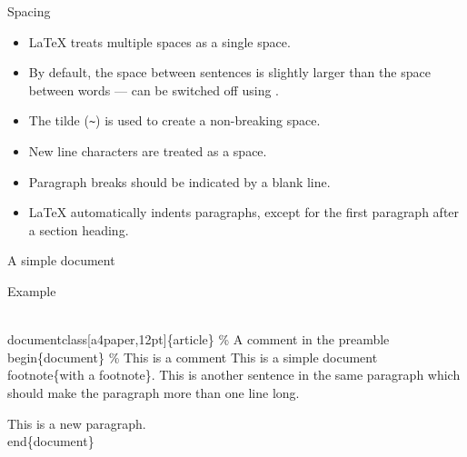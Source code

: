 \begin{frame}[fragile]{Spacing}

	\begin{itemize}
	  \item \LaTeX{} treats multiple spaces as a single space.
	  \item By default, the space between sentences is slightly larger than the space between words --- can be switched off using .
	  \item The tilde (\verb|~|) is used to create a non-breaking space.
	  \item New line characters are treated as a space.
	  \item Paragraph breaks should be indicated by a blank line.
	  \item \LaTeX{} automatically indents paragraphs, except for the first paragraph after a section heading.
	\end{itemize}

\end{frame}

\begin{frame}[fragile]{A simple document}
  \begin{block}{Example}
	\begin{semiverbatim}
	  \alert<2>{\\documentclass}\alert<2,4>{[a4paper,12pt]}\alert<2-3>{\{article\}}
	  \alert<5>{\% A comment in the preamble}
	  \alert<6>{\\begin\{document\}}
	  \alert<7>{\% This is a comment}
	  \alert<8>{This is   a simple document\\footnote\{with a footnote\}.}
	  \alert<8>{This is another sentence in the same paragraph which should}
	  \alert<8>{make the paragraph more than one line long.}

	  \alert<8>{This is a new paragraph.}
	  \alert<6>{\\end\{document\}}
	\end{semiverbatim}
  \end{block}

\end{frame}

